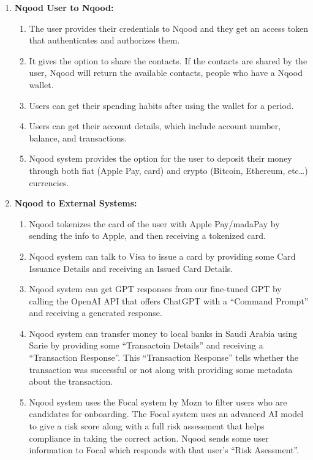 \documentclass[a4paper]{report}
\begin{document}
\begin{enumerate}
    \item \textbf{Nqood User to Nqood:}
        \begin{enumerate}
            \item The user provides their credentials to Nqood and they get an access token that authenticates and authorizes them.
            \item It gives the option to share the contacts. If the contacts are shared by the user, Nqood will return the available contacts, people who have a Nqood wallet.
            \item Users can get their spending habits after using the wallet for a period.
            \item Users can get their account details, which include account number, balance, and transactions.
            \item Nqood system provides the option for the user to deposit their money through both fiat (Apple Pay, card) and crypto (Bitcoin, Ethereum, etc…) currencies.
        \end{enumerate}
    \item \textbf{Nqood to External Systems:}
        \begin{enumerate}
            \item Nqood tokenizes the card of the user with Apple Pay/madaPay by sending the info to Apple, and then receiving a tokenized card.
            \item Nqood system can talk to Visa to issue a card by providing some Card Issuance Details and receiving an Issued Card Details.
            \item Nqood system can get GPT responses from our fine-tuned GPT by calling the OpenAI API that offers ChatGPT with a “Command Prompt” and receiving a generated response.
            \item Nqood system can transfer money to local banks in Saudi Arabia using Sarie by providing some “Transactoin Details” and receiving a “Transaction Response”. This “Transaction Response” tells whether the transaction was successful or not along with providing some metadata about the transaction.
            \item Nqood system uses the Focal system by Mozn to filter users who are candidates for onboarding. The Focal system uses an advanced AI model to give a risk score along with a full risk assessment that helps compliance in taking the correct action. Nqood sends some user information to Focal which responds with that user’s “Risk Asessment”.

\end{enumerate}
\end{enumerate}
\end{document}

